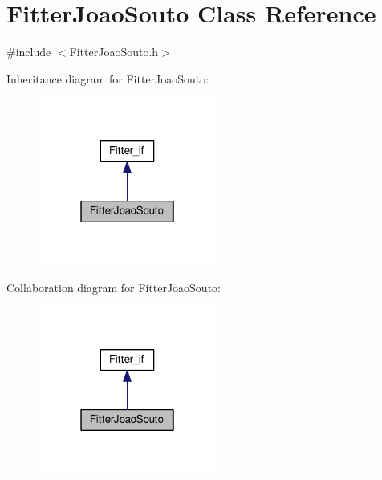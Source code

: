 \hypertarget{class_fitter_joao_souto}{\section{Fitter\-Joao\-Souto Class Reference}
\label{class_fitter_joao_souto}
}


{\ttfamily \#include $<$Fitter\-Joao\-Souto.\-h$>$}



Inheritance diagram for Fitter\-Joao\-Souto\-:
\nopagebreak
\begin{figure}[H]
\begin{center}
\leavevmode
\includegraphics[width=166pt]{class_fitter_joao_souto__inherit__graph}
\end{center}
\end{figure}


Collaboration diagram for Fitter\-Joao\-Souto\-:
\nopagebreak
\begin{figure}[H]
\begin{center}
\leavevmode
\includegraphics[width=166pt]{class_fitter_joao_souto__coll__graph}
\end{center}
\end{figure}
